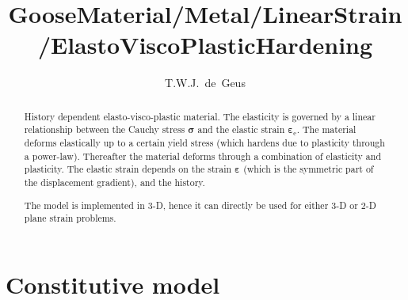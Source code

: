 \documentclass[times,namecite]{goose-article}
\title{%
  GooseMaterial/Metal/LinearStrain/ElastoViscoPlasticHardening
}
\author{T.W.J.~de~Geus}
\begin{document}
\maketitle

\begin{abstract}
History dependent elasto-visco-plastic material. The elasticity is governed by a linear relationship between the Cauchy stress $\bm{\sigma}$ and the elastic strain $\bm{\varepsilon}_\mathrm{e}$. The material deforms elastically up to a certain yield stress (which hardens due to plasticity through a power-law). Thereafter the material deforms through a combination of elasticity and plasticity. The elastic strain depends on the strain $\bm{\varepsilon}$ (which is the symmetric part of the displacement gradient), and the history.

The model is implemented in 3-D, hence it can directly be used for either 3-D or 2-D plane strain problems.
\end{abstract}


\setcounter{tocdepth}{2}
\tableofcontents

\vfill\newpage
\section{Constitutive model}
\end{document}
